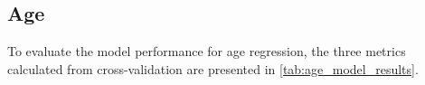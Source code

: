 
\subsection{Age}
To evaluate the model performance for age regression, the three metrics calculated from cross-validation are presented in \cref{tab:age_model_results}.

